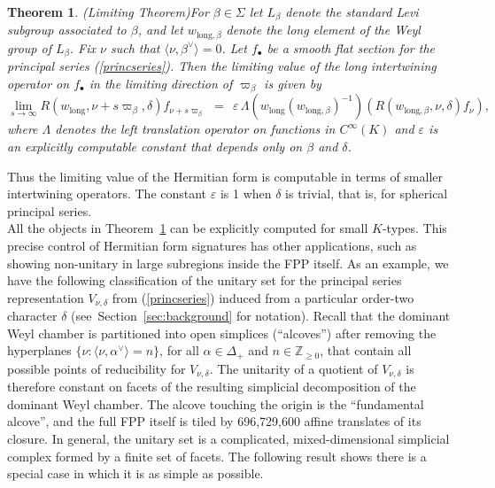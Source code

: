 \documentclass[12pt]{article}
\newtheorem{thm}[equation]{Theorem}
\newcommand{\thmref}[1]{Theorem~\ref{#1}}
\newcommand{\secref}[1]{Section~\ref{#1}}
\numberwithin{equation}{section}
\renewcommand\a{\alpha}
\renewcommand\b{\beta}
\renewcommand\d{\delta}
\newcommand\e{\varepsilon}
\renewcommand\i{^{-1}}
\renewcommand\({\left(}
\renewcommand\){\right)}
\begin{document}
\begin{thm}(Limiting Theorem)\label{thm:limit}
For $\b\in\Sigma$ let
$L_\beta$ denote the standard Levi subgroup associated to $\beta$, and let $w_{\text{long},\b}$ denote the long element of the Weyl group of $L_\beta$.
 Fix $\nu$ such that $\langle \nu,\beta^\vee\rangle=0$.  Let $f_\bullet$ be a smooth flat section for the principal series (\ref{princseries}).
Then the limiting value of the long intertwining operator on $f_\bullet$  in the limiting direction of $\varpi_\b$ is given by
\begin{equation}\label{limittheorem}
  \lim_{s\rightarrow\infty} R(w_{\text{long}},\nu+s\varpi_\beta,\delta)f_{\nu+s\varpi_\beta}
 \ \ = \ \
\e\,\Lambda(w_\text{long}(w_{\text{long},\beta})\i)(R(w_{\text{long},\b},\nu,\d)f_\nu),
\end{equation}
where $\Lambda$ denotes the left translation operator on functions in $C^\infty(K)$ and $\e$ is an explicitly computable constant that depends only on $\beta$ and $\delta$.
\end{thm}


\noindent Thus the limiting value of the Hermitian form is computable in terms of smaller intertwining operators.  The constant $\e$ is 1 when $\delta$ is trivial, that is, for spherical principal series.  \\

  All the objects in \thmref{thm:limit} can be explicitly computed for small $K$-types.
This precise control of Hermitian form signatures has other applications, such as showing non-unitary in large subregions inside the FPP itself.  As an example, we have the following classification of the unitary set for the principal series representation $V_{\nu,\d}$ from (\ref{princseries}) induced from a particular order-two character $\d$ (see~\secref{sec:background} for notation).  Recall that the dominant Weyl chamber is partitioned into open simplices (``alcoves'') after removing the hyperplanes $\{\nu : \langle \nu,\a^\vee\rangle =n\}$, for all $\a\in\Delta_+$ and $n\in \mathbb{Z}_{\ge 0}$, that contain all possible points of reducibility for $V_{\nu,\d}$.  The  unitarity of a quotient of $V_{\nu,\d}$ is therefore constant on facets of the resulting simplicial decomposition of the dominant Weyl chamber.  The alcove touching the origin is the ``fundamental alcove'', and the full FPP itself is tiled by 696,729,600 affine translates of its closure.  In general, the unitary set is a complicated, mixed-dimensional simplicial complex formed by a finite set of facets.  The following result shows there is a special case in which it is as simple as possible.
\end{document}
